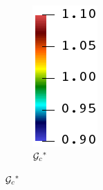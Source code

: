 \begin{figure}[!htbp]
\begin{subfigure}[b]{0.25\textwidth}
    \end{subfigure}
    \begin{subfigure}[b]{0.05\textwidth}
        \caption*{${\mathcal{G}_c}^*$}
        \includegraphics[width=\textwidth]{colorbar/rainbow_vertical.png}
    \end{subfigure}


\end{figure}

